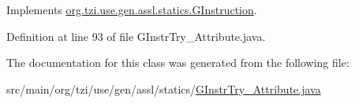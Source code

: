 Implements \hyperlink{interfaceorg_1_1tzi_1_1use_1_1gen_1_1assl_1_1statics_1_1_g_instruction_a2ce478cb4d7c839fec6db330099638a9}{org.\-tzi.\-use.\-gen.\-assl.\-statics.\-G\-Instruction}.



Definition at line 93 of file G\-Instr\-Try\-\_\-\-Attribute.\-java.



The documentation for this class was generated from the following file\-:\begin{DoxyCompactItemize}
\item 
src/main/org/tzi/use/gen/assl/statics/\hyperlink{_g_instr_try___attribute_8java}{G\-Instr\-Try\-\_\-\-Attribute.\-java}\end{DoxyCompactItemize}
